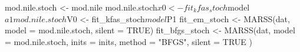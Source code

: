 \begin{Schunk}
\begin{Sinput}
 mod.nile.stoch <- mod.nile
 mod.nile.stoch$x0 <- fit_kfas_stoch$model$a1
 mod.nile.stoch$V0 <- fit_kfas_stoch$model$P1
 fit_em_stoch <- MARSS(dat, model = mod.nile.stoch, silent = TRUE)
 fit_bfgs_stoch <- MARSS(dat,
   model = mod.nile.stoch, inits = inits,
   method = "BFGS", silent = TRUE
 )
\end{Sinput}
\end{Schunk}
